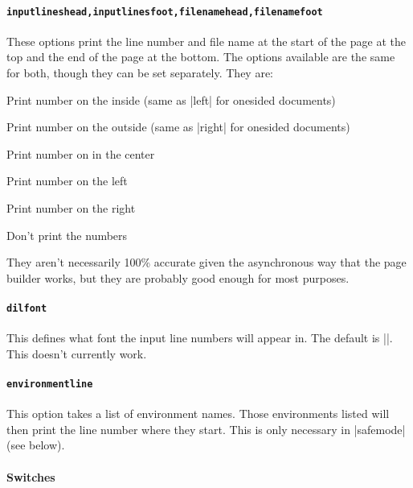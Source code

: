 \documentclass[twoside]{scrartcl}
\begin{document}
\paragraph{\lstinline+inputlineshead,inputlinesfoot,filenamehead,filenamefoot+}

These options print the line number and file name at the start of the
page at the top and the end of the page at the bottom. 
The options available are the same for both, though they can be set separately. 
They are:
\begin{description}[labelindent=1cm]
\item[inside] Print number on the inside (same as |left| for onesided
  documents)
\item[outside] Print number on the outside (same as |right| for
  onesided documents)
\item[center] Print number on in the center
\item[left] Print number on the left
\item[right] Print number on the right
\item[off] Don't print the numbers
\end{description}

They aren't necessarily 100\% accurate given the asynchronous way that
the page builder works, but they are probably good enough for most purposes.

\paragraph{\lstinline+dilfont+}

This defines what font the input line numbers will appear in.
The default is |\ttfamily\small|.
This doesn't currently work.

\paragraph{\lstinline+environmentline+}

This option takes a list of environment names.
Those environments listed will then print the line number where they
start.
This is only necessary in |safemode| (see below).

\paragraph{Switches}
\end{document}
